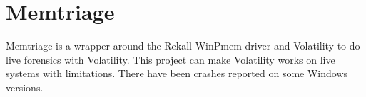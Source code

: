 \section[Memtriage]{Memtriage}

Memtriage \cite{memtriage} is a wrapper around the Rekall WinPmem driver and
Volatility to do live forensics with Volatility.  This project can make
Volatility works on live systems with limitations. There have been crashes
reported on some Windows versions.

